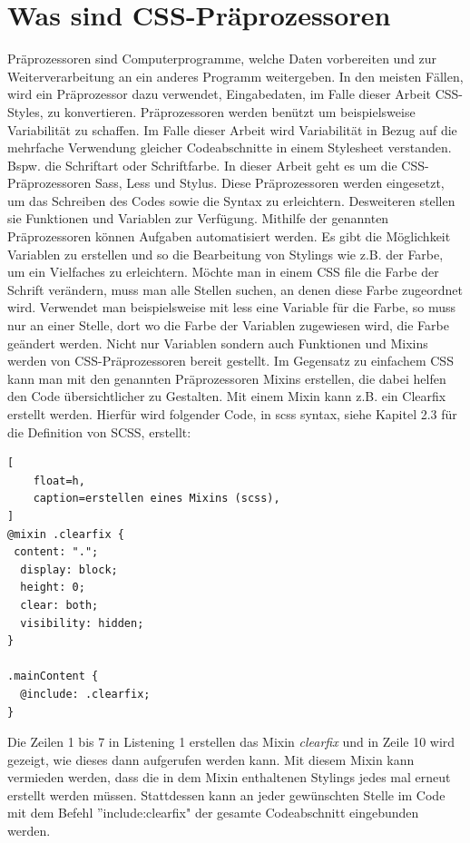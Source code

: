 \section{Was sind CSS-Präprozessoren}
Präprozessoren sind Computerprogramme, welche Daten vorbereiten und zur Weiterverarbeitung an ein anderes Programm weitergeben. In den meisten Fällen, wird ein Präprozessor dazu verwendet, Eingabedaten, im Falle dieser Arbeit CSS-Styles, zu konvertieren.\autocite[]{Peter.2012}\newline
Präprozessoren werden benützt um beispielsweise Variabilität zu schaffen. Im Falle dieser Arbeit wird Variabilität in Bezug auf die mehrfache Verwendung gleicher Codeabschnitte in einem Stylesheet verstanden. Bspw. die Schriftart oder Schriftfarbe.
In dieser Arbeit geht es um die CSS-Präprozessoren Sass, Less und Stylus. Diese Präprozessoren werden eingesetzt, um das Schreiben des Codes sowie die Syntax zu erleichtern. Desweiteren stellen sie Funktionen und Variablen zur Verfügung. \newline
Mithilfe der genannten Präprozessoren können Aufgaben automatisiert werden. Es gibt die Möglichkeit Variablen zu erstellen und so die Bearbeitung von Stylings wie z.B. der Farbe, um ein Vielfaches zu erleichtern. Möchte man in einem CSS file die Farbe der Schrift verändern, muss man alle Stellen suchen, an denen diese Farbe zugeordnet wird. Verwendet man beispielsweise mit less eine Variable für die Farbe, so muss nur an einer Stelle, dort wo die Farbe der Variablen zugewiesen wird, die Farbe geändert werden.\newline
Nicht nur Variablen sondern auch Funktionen und Mixins werden von CSS-Präprozessoren bereit gestellt. Im Gegensatz zu einfachem CSS kann man mit den genannten Präprozessoren Mixins erstellen, die dabei helfen den Code übersichtlicher zu Gestalten. Mit einem Mixin kann z.B. ein Clearfix erstellt werden. Hierfür wird folgender Code, in scss syntax, siehe Kapitel 2.3 für die Definition von SCSS, erstellt:
\begin{lstlisting}[
	float=h,
	caption=erstellen eines Mixins (scss),
]
@mixin .clearfix {
 content: ".";
  display: block;
  height: 0;
  clear: both;
  visibility: hidden;
}

.mainContent {
  @include: .clearfix;
}
\end{lstlisting}
\newline
Die Zeilen 1 bis 7 in Listening 1 erstellen das Mixin \textit{clearfix} und in Zeile 10 wird gezeigt, wie dieses dann aufgerufen werden kann. Mit diesem Mixin kann vermieden werden, dass die in dem Mixin enthaltenen Stylings jedes mal erneut erstellt werden müssen. Stattdessen kann an jeder gewünschten Stelle im Code mit dem Befehl ''include:clearfix" der gesamte Codeabschnitt eingebunden werden.

